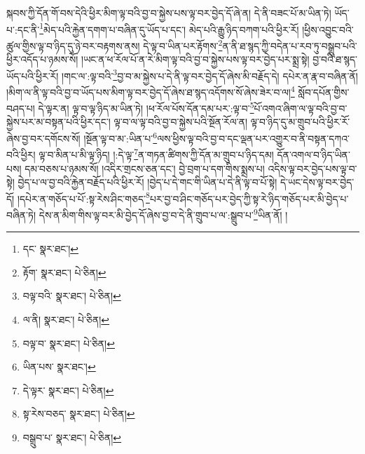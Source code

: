 སྐབས་ཀྱི་དོན་གོ་བས་དེའི་ཕྱིར་མིག་ལྟ་བའི་བྱ་བ་སྐྱེས་པས་ལྟ་བར་བྱེད་དོ་ཞེ་ན། དེ་ནི་བཟང་པོ་མ་ཡིན་ཏེ། ཡོད་པ་:དང་ནི་\footnote{དང་  སྣར་ཐང་། }མེད་པའི་རྐྱེན་དགག་པ་བཞིན་དུ་ཡོད་པ་དང་། མེད་པའི་རྒྱུ་ཉིད་བཀག་པའི་ཕྱིར་རོ། །ཕྱིས་འབྱུང་བའི་ཚུལ་གྱིས་ལྟ་བ་ཉིད་དུ་ཉེ་བར་བརྟགས་ནས། དེ་ལྟ་བ་ཡིན་པར་རྟོགས་\footnote{རྟོག་  སྣར་ཐང་།  པེ་ཅིན། }ན་ནི་ཐ་སྙད་ཀྱི་བདེན་པ་རབ་ཏུ་བསྒྲུབ་པའི་ཕྱིར་འདོད་པ་ཉམས་སོ། །ཡང་ན་ཕ་རོལ་པོ་ན་རེ་མིག་ལྟ་བའི་བྱ་བ་སྐྱེས་པས་ལྟ་བར་བྱེད་པར་སྨྲ་སྟེ། བྱ་བའི་ཐ་སྙད་ཡོད་པའི་ཕྱིར་རོ། །གང་ལ་:ལྟ་བའི་\footnote{བལྟ་བའི་  སྣར་ཐང་།  པེ་ཅིན། }བྱ་བ་མ་སྐྱེས་པ་དེ་ནི་ལྟ་བར་བྱེད་དོ་ཞེས་མི་བརྗོད་དེ། དཔེར་ན་རྣ་བ་བཞིན་ནོ། །མིག་ལ་ནི་ལྟ་བའི་བྱ་བ་ཡོད་པས་མིག་ལྟ་བར་བྱེད་དོ་ཞེས་ཐ་སྙད་འདོགས་སོ་ཞེས་ཟེར་བ་ལ།\footnote{ལ་ནི།  སྣར་ཐང་།  པེ་ཅིན། } སློབ་དཔོན་གྱིས་བཤད་པ། དེ་ལྟར་ན། ལྟ་བ་ལྟ་ཉིད་མ་ཡིན་ཏེ། །ཕ་རོལ་པོས་དོན་དམ་པར་:ལྟ་བ་\footnote{བལྟ་བ་  སྣར་ཐང་།  པེ་ཅིན། }པོ་འགའ་ཞིག་ལ་ལྟ་བའི་བྱ་བ་སྐྱེས་པར་མ་བསྟན་པའི་ཕྱིར་དང་། ལྟ་བ་ལ་ལྟ་བའི་བྱ་བ་སྐྱེས་པའི་སྔོན་རོལ་ན། ལྟ་བ་ཉིད་དུ་མ་གྲུབ་པའི་ཕྱིར་རོ་ཞེས་བྱ་བར་དགོངས་སོ། །སྔོན་ལྟ་བ་མ་:ཡིན་པ་\footnote{ཡིན་པས་  སྣར་ཐང་། }ལས་ཕྱིས་ལྟ་བའི་བྱ་བ་དང་ལྡན་པར་འགྱུར་བ་ནི་བསྟན་དཀའ་བའི་ཕྱིར། ལྟ་བ་མིན་པ་མི་ལྟ་ཉིད། །:དེ་ལྟ་\footnote{དེ་ལྟར་  སྣར་ཐང་།  པེ་ཅིན། }ན་གཏན་ཚིགས་ཀྱི་དོན་མ་གྲུབ་པ་ཉིད་དམ། དོན་འགལ་བ་ཉིད་ཡིན་པས། དམ་བཅས་པ་ཉམས་སོ། །འདིར་གྲངས་ཅན་དང་། བྱེ་བྲག་པ་དག་གིས་སྨྲས་པ། འདིས་ལྟ་བར་བྱེད་པས་ལྟ་བ་སྟེ། བྱེད་པ་ལ་བྱ་བའི་རྐྱེན་བརྗོད་པའི་ཕྱིར་རོ། །བྱེད་པ་དེ་གང་གི་ཡིན་པ་དེ་ནི་ལྟ་བ་པོ་སྟེ། དེ་ཡང་དེས་ལྟ་བར་བྱེད་དོ། །དཔེར་ན་གཅོད་པ་པོ་:སྟ་རེས་ཤིང་གཅད་\footnote{སྟ་རེས་བཅད་  སྣར་ཐང་།  པེ་ཅིན། }པར་བྱ་བ་ཤིང་གཅོད་པར་བྱེད་ཀྱི་སྟ་རེ་ཉིད་གཅོད་པར་མི་བྱེད་པ་བཞིན་ཏེ། དེས་ན་མིག་གིས་ལྟ་བར་མི་བྱེད་དོ་ཞེས་བྱ་བ་དེ་ནི་གྲུབ་པ་ལ་:སྒྲུབ་པ་\footnote{བསྒྲུབ་པ་  སྣར་ཐང་།  པེ་ཅིན། }ཡིན་ནོ། །
